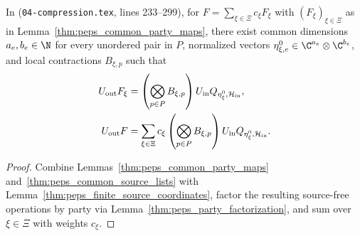 \begin{lemma}
    \label{thm:peps_finite_source_gate}
    \leanok
    In \cite[proof of Theorem~5.2]{OpenAI2026PolynomialPEPS}
    (\texttt{04-compression.tex}, lines 233--299), for $F=\sum_{\xi\in\Xi}c_\xi F_\xi$
    with $(F_\xi)_{\xi\in\Xi}$ as in Lemma~\ref{thm:peps_common_party_maps},
    there exist common dimensions $a_e,b_e\in\N$ for every unordered pair in
    $P$, normalized vectors $\eta^0_{\xi,e}\in\C^{a_e}\otimes\C^{b_e}$, and
    local contractions $B_{\xi,p}$ such that
    \begin{align}
        U_{\rm out}F_\xi
         & =\left(\bigotimes_{p\in P}B_{\xi,p}\right)
        U_{\rm in}Q_{\eta^0_\xi,\mathcal H_{\rm in}}, \notag \\
        U_{\rm out}F
         & =\sum_{\xi\in\Xi}c_\xi
        \left(\bigotimes_{p\in P}B_{\xi,p}\right)
        U_{\rm in}Q_{\eta^0_\xi,\mathcal H_{\rm in}}.
        \label{eq:peps_finite_source_gate}
    \end{align}
\end{lemma}

\begin{proof}\leanok
    Combine Lemmas~\ref{thm:peps_common_party_maps}
    and~\ref{thm:peps_common_source_lists} with
    Lemma~\ref{thm:peps_finite_source_coordinates}, factor the resulting
    source-free operations by party via Lemma~\ref{thm:peps_party_factorization},
    and sum over $\xi\in\Xi$ with weights $c_\xi$.
\end{proof}
